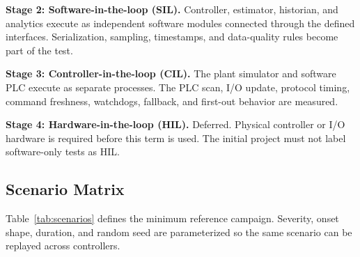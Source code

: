 \documentclass[conference]{IEEEtran}
\begin{document}
\textbf{Stage 2: Software-in-the-loop (SIL).} Controller, estimator, historian, and analytics execute as independent software modules connected through the defined interfaces. Serialization, sampling, timestamps, and data-quality rules become part of the test.

\textbf{Stage 3: Controller-in-the-loop (CIL).} The plant simulator and software PLC execute as separate processes. The PLC scan, I/O update, protocol timing, command freshness, watchdogs, fallback, and first-out behavior are measured.

\textbf{Stage 4: Hardware-in-the-loop (HIL).} Deferred. Physical controller or I/O hardware is required before this term is used. The initial project must not label software-only tests as HIL.

\subsection{Scenario Matrix}
Table~\ref{tab:scenarios} defines the minimum reference campaign. Severity, onset shape, duration, and random seed are parameterized so the same scenario can be replayed across controllers.
\end{document}
